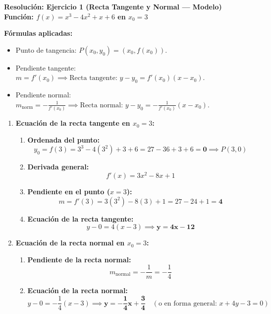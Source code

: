 ﻿\documentclass[11pt,a4paper]{article}
\begin{document}
\pagestyle{empty}

\begin{center}
    {\LARGE \textbf{Resolución: Ejercicio 1 (Recta Tangente y Normal — Modelo)}}\\[4pt]
    {\large \textbf{Función: $f(x) = x^3 - 4x^2 + x + 6$ en $x_0 = 3$}}
\end{center}

\vspace{0.3cm}
\begin{tcolorbox}
\textbf{Fórmulas aplicadas:}
\begin{itemize}[leftmargin=1.5em, itemsep=2pt]
    \item Punto de tangencia: $P(x_0, y_0) = (x_0, f(x_0))$.
    \item Pendiente tangente: $m = f'(x_0) \implies \text{Recta tangente: } y - y_0 = f'(x_0)(x - x_0)$.
    \item Pendiente normal: $m_{\text{norm}} = -\frac{1}{f'(x_0)} \implies \text{Recta normal: } y - y_0 = -\frac{1}{f'(x_0)}(x - x_0)$.
\end{itemize}
\end{tcolorbox}

\vspace{0.2cm}
\begin{enumerate}[label=\textbf{\alph*)}, leftmargin=2em, itemsep=8pt]
    \item \textbf{Ecuación de la recta tangente en $x_0 = 3$:}
    \begin{enumerate}[label=\arabic*., leftmargin=1.5em, itemsep=2pt]
        \item \textbf{Ordenada del punto:}
        \[
        y_0 = f(3) = 3^3 - 4(3^2) + 3 + 6 = 27 - 36 + 3 + 6 = \mathbf{0} \implies P(3, 0)
        \]
        \item \textbf{Derivada general:}
        \[
        f'(x) = 3x^2 - 8x + 1
        \]
        \item \textbf{Pendiente en el punto ($x = 3$):}
        \[
        m = f'(3) = 3(3^2) - 8(3) + 1 = 27 - 24 + 1 = \mathbf{4}
        \]
        \item \textbf{Ecuación de la recta tangente:}
        \[
        y - 0 = 4(x - 3) \implies \mathbf{y = 4x - 12}
        \]
    \end{enumerate}

    \item \textbf{Ecuación de la recta normal en $x_0 = 3$:}
    \begin{enumerate}[label=\arabic*., leftmargin=1.5em, itemsep=2pt]
        \item \textbf{Pendiente de la recta normal:}
        \[
        m_{\text{normal}} = -\frac{1}{m} = -\frac{1}{4}
        \]
        \item \textbf{Ecuación de la recta normal:}
        \[
        y - 0 = -\frac{1}{4}(x - 3) \implies \mathbf{y = -\frac{1}{4}x + \frac{3}{4}} \quad (\text{o en forma general: } x + 4y - 3 = 0)
        \]
    \end{enumerate}
\end{enumerate}
\end{document}
